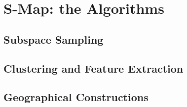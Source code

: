 \section{S-Map: the Algorithms}
\subsection{Subspace Sampling}
\subsection{Clustering and Feature Extraction}
\subsection{Geographical Constructions}